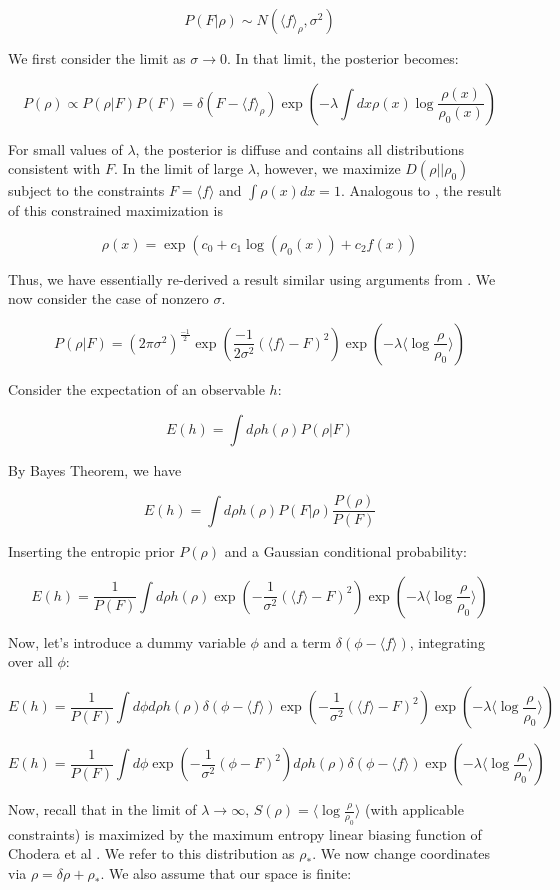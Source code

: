 \documentclass[12pt]{article}
\begin{document}
$$P(F|\rho) \sim N(\langle f\rangle_\rho, \sigma^2)$$

We first consider the limit as $\sigma \rightarrow 0$.  In that limit, the posterior becomes:

$$P(\rho) \propto P(\rho | F) P(F) = \delta(F - \langle f\rangle_\rho) \exp(- \lambda \int dx \rho(x) \log \frac{\rho(x)}{\rho_0(x)}) $$

For small values of $\lambda$, the posterior is diffuse and contains all distributions consistent with $F$.  In the limit of large $\lambda$, however, we maximize $D(\rho || \rho_0)$ subject to the constraints $F = \langle f \rangle$ and $\int \rho(x) dx = 1$.  Analogous to \cite{crooks2007beyond, chodera2012}, the result of this constrained maximization is

$$\rho(x) = \exp(c_0 + c_1 \log(\rho_0(x)) + c_2 f(x))$$

Thus, we have essentially re-derived a result similar \cite{chodera2012} using arguments from \cite{crooks2007beyond}.  We now consider the case of nonzero $\sigma$.  

$$P(\rho|F) = (2 \pi \sigma^2)^\frac{-1}{2} \exp(\frac{-1}{2\sigma^2} (\langle f \rangle - F)^2) \exp(-\lambda \langle \log \frac{\rho}{\rho_0} \rangle)$$

Consider the expectation of an observable $h$:

$$E(h) = \int d\rho h(\rho) P(\rho|F)$$

By Bayes Theorem, we have

$$E(h) = \int d\rho h(\rho) P(F | \rho) \frac{P(\rho)}{P(F)} $$

Inserting the entropic prior $P(\rho)$ and a Gaussian conditional probability:

$$E(h) = \frac{1}{P(F)} \int d\rho h(\rho) \exp(-\frac{1}{\sigma^2} (\langle f \rangle - F)^2) \exp(-\lambda \langle \log \frac{\rho}{\rho_0} \rangle)$$

Now, let's introduce a dummy variable $\phi$ and a term $\delta(\phi -  \langle f \rangle)$, integrating over all $\phi$:  

$$E(h) = \frac{1}{P(F)} \int d\phi d\rho h(\rho) \delta(\phi -  \langle f \rangle) \exp(-\frac{1}{\sigma^2} (\langle f \rangle - F)^2) \exp(-\lambda \langle \log \frac{\rho}{\rho_0} \rangle)$$

$$E(h) = \frac{1}{P(F)} \int d\phi \exp(-\frac{1}{\sigma^2} (\phi - F)^2)  d\rho h(\rho) \delta(\phi -  \langle f \rangle)  \exp(-\lambda \langle \log \frac{\rho}{\rho_0} \rangle)$$

Now, recall that in the limit of $\lambda \rightarrow \infty$, $S(\rho) = \langle \log\frac{\rho}{\rho_0} \rangle$ (with applicable constraints) is maximized by the maximum entropy linear biasing function of Chodera et al \cite{chodera2012}.  We refer to this distribution as $\rho_*$.  We now change coordinates via $\rho = \delta \rho + \rho_*$.  We also assume that our space is finite:
\end{document}
